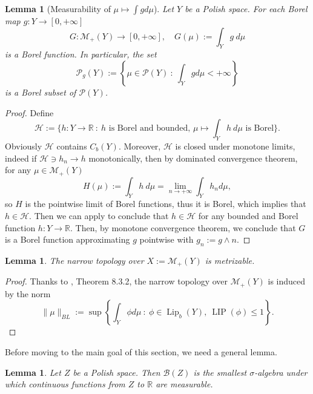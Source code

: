 \documentclass[10pt,leqno]{amsart}
\numberwithin{equation}{section}
\newtheorem{lemma}[teorema]{Lemma}
\newcommand{\R}{\mathbb{R}}
\newcommand{\PP}{\mathcal{P}}
\begin{document}
\fi

\begin{lemma}[Measurability of $\mu\mapsto \int gd\mu$]\label{measurability int g d mu}
    Let $Y$ be a Polish space. For each Borel map $g:Y\to [0,+\infty]$ 
     \[G: \mathcal{M}_+(Y)\to[0,+\infty], \quad G(\mu):= \int_Y g \ d\mu\]
     is a Borel function. In particular, the set 
     \[\PP_g(Y):= \left\{\mu \in \PP(Y) \ : \ \int_Y g d\mu <+\infty\right\}\]
     is a Borel subset of $\PP(Y)$.
\end{lemma}

\begin{proof}
    Define \[\mathcal{H}:= \{h:Y\to\R \ : \ h\text{ is Borel and bounded, } \mu \mapsto \int_Y h \ d\mu \text{ is Borel}\}.\]
    Obviously $\mathcal{H}$ contains $C_b(Y)$. Moreover, $\mathcal{H}$ is closed under monotone limits, indeed if $\mathcal{H}\ni h_n \to h$ monotonically, then by dominated convergence theorem, for any $\mu \in \mathcal{M}_+(Y)$ 
    \[H(\mu):= \int_Y h \ d\mu = \lim_{n\to+\infty} \int_Y h_n d\mu,\]
    so $H$ is the pointwise limit of Borel functions, thus it is Borel, which implies that $h\in \mathcal{H}$. Then we can apply \cite[Theorem 2.12.9, (iii)]{Bogachev07} to conclude that $h\in \mathcal{H}$ for any bounded and Borel function $h:Y \to \R$. Then, by monotone convergence theorem, we conclude that $G$ is a Borel function approximating $g$ pointwise with $g_n:= g\wedge n$.
\end{proof}



\begin{lemma}\label{weak conv is metrizable}
    The narrow topology over $X := \mathcal{M}_+(Y)$ is metrizable. 
\end{lemma}



\begin{proof}
    Thanks to \cite{Bogachev07}, Theorem 8.3.2, the narrow topology over $\mathcal{M}_+(Y)$ is induced by the norm 
    \begin{equation}
        \lVert \mu \rVert_{BL}:= \sup  \left\{ \int_Y \phi d\mu \ : \ \phi\in \operatorname{Lip}_b(Y), \ \operatorname{LIP}(\phi)\leq 1 \right\}.
    \end{equation}
\end{proof}

Before moving to the main goal of this section, we need a general lemma.

\begin{lemma}
    Let $Z$ be a Polish space. Then $\mathcal{B}(Z)$ is the smallest $\sigma$-algebra under which continuous functions from $Z$ to $\R$ are measurable. 
\end{lemma}
\end{document}
